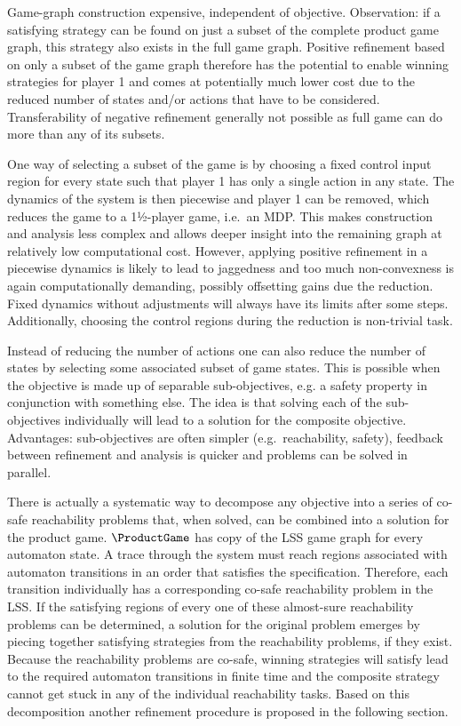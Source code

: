 Game-graph construction expensive, independent of objective.
Observation: if a satisfying strategy can be found on just a subset of the complete product game graph, this strategy also exists in the full game graph.
Positive refinement based on only a subset of the game graph therefore has the potential to enable winning strategies for player 1 and comes at potentially much lower cost due to the reduced number of states and/or actions that have to be considered.
Transferability of negative refinement generally not possible as full game can do more than any of its subsets.

One way of selecting a subset of the game is by choosing a fixed control input region for every state such that player 1 has only a single action in any state.
The dynamics of the system is then piecewise and player 1 can be removed, which reduces the game to a 1½-player game, i.e.\ an MDP.
This makes construction and analysis less complex and allows deeper insight into the remaining graph at relatively low computational cost.
However, applying positive refinement in a piecewise dynamics is likely to lead to jaggedness and too much non-convexness is again computationally demanding, possibly offsetting gains due the reduction.
Fixed dynamics without adjustments will always have its limits after some steps.
Additionally, choosing the control regions during the reduction is non-trivial task.

Instead of reducing the number of actions one can also reduce the number of states by selecting some associated subset of game states.
This is possible when the objective is made up of separable sub-objectives, e.g. a safety property in conjunction with something else.
The idea is that solving each of the sub-objectives individually will lead to a solution for the composite objective.
Advantages: sub-objectives are often simpler (e.g.\ reachability, safety), feedback between refinement and analysis is quicker and problems can be solved in parallel.

There is actually a systematic way to decompose any objective into a series of co-safe reachability problems that, when solved, can be combined into a solution for the product game.
$\ProductGame$ has copy of the LSS game graph for every automaton state.
A trace through the system must reach regions associated with automaton transitions in an order that satisfies the specification.
Therefore, each transition individually has a corresponding co-safe reachability problem in the LSS.
If the satisfying regions of every one of these almost-sure reachability problems can be determined, a solution for the original problem emerges by piecing together satisfying strategies from the reachability problems, if they exist.
Because the reachability problems are co-safe, winning strategies will satisfy lead to the required automaton transitions in finite time and the composite strategy cannot get stuck in any of the individual reachability tasks.
Based on this decomposition another refinement procedure is proposed in the following section.

